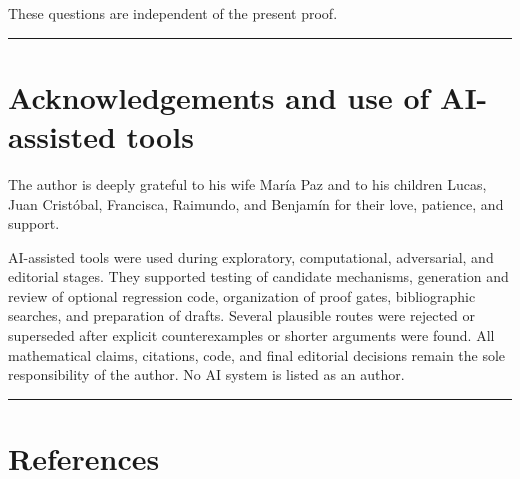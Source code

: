\documentclass[11pt,a4paper]{article}
\begin{document}
These questions are independent of the present proof.

\begin{center}\rule{0.5\linewidth}{0.5pt}\end{center}

\section{Acknowledgements and use of AI-assisted tools}\label{acknowledgements-and-use-of-ai-assisted-tools}

The author is deeply grateful to his wife María Paz and to his children
Lucas, Juan Cristóbal, Francisca, Raimundo, and Benjamín for their love,
patience, and support.

AI-assisted tools were used during exploratory, computational, adversarial,
and editorial stages. They supported testing of candidate mechanisms, generation and review of
optional regression code, organization of proof gates, bibliographic
searches, and preparation of drafts. Several plausible routes
were rejected or superseded after explicit counterexamples or shorter
arguments were found. All mathematical claims, citations, code, and final
editorial decisions remain the sole responsibility of the author. No AI
system is listed as an author.

\begin{center}\rule{0.5\linewidth}{0.5pt}\end{center}

\section{References}\label{references}
\end{document}
